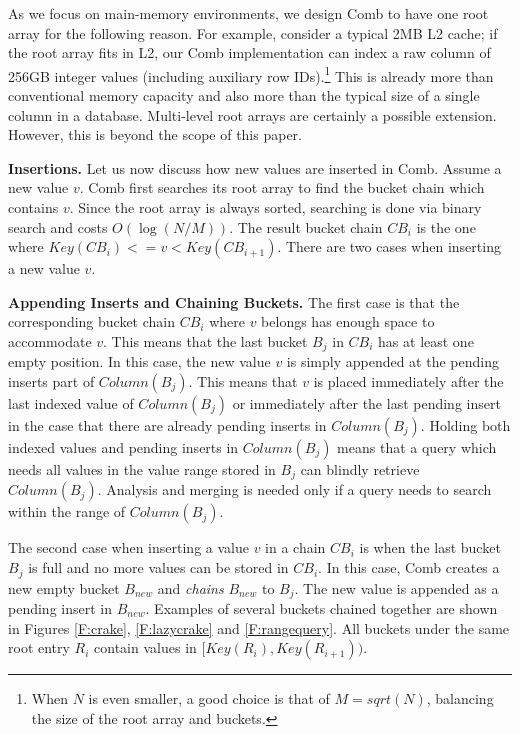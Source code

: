 \documentclass{sig-alternate}
\begin{document}
As we focus on main-memory environments, we design
Comb to have one root array for the following reason.
For example, consider a typical 2MB L2 cache; if the root array fits in L2,
our Comb implementation can index
a raw column of 256GB integer values (including auxiliary row IDs).\footnote{
\small
When $N$ is even smaller,  a good choice is that of $M = sqrt(N)$,
balancing the size of the root array and buckets.
}
This is already more than conventional memory capacity and
also more than the typical size of a single column in a database.
Multi-level root arrays are certainly a possible extension.
However, this is beyond the scope of this paper.

\textbf{Insertions.}
Let us now discuss how new values are inserted in Comb.
Assume a new value $v$.
Comb first searches its root array to find the bucket chain which contains $v$.
Since the root array is always sorted, searching is done via binary search and costs $O(\log(N/M))$.
The result bucket chain $CB_i$ is the one where $Key(CB_i)<=v<Key(CB_{i+1})$.
There are two cases when inserting a new value $v$.

\textbf{Appending Inserts and Chaining Buckets.}
The first case is that the corresponding bucket chain $CB_i$ where $v$ belongs has enough space to accommodate $v$.
This means that the last bucket $B_j$ in $CB_i$ has at least one empty position.
In this case, the new value $v$ is simply appended at the pending inserts part of $Column(B_j)$.
This means that $v$ is placed immediately after the last indexed value of $Column(B_j)$ or immediately after the
last pending insert in the case that there are already pending inserts in $Column(B_j)$.
Holding both indexed values and pending inserts in $Column(B_j)$ means that a query which needs all values
in the value range stored in $B_j$ can blindly retrieve $Column(B_j)$. Analysis and merging is needed
only if a query needs to search within the range of $Column(B_j)$.

The second case when inserting a value $v$ in a chain $CB_i$
is when the last bucket $B_j$ is full and no more values can be stored in $CB_i$.
In this case, Comb creates a new empty bucket $B_{new}$
and \emph{chains} $B_{new}$ to $B_j$. The new value is appended as a pending insert in $B_{new}$.
Examples of several buckets chained together are shown in Figures \ref{F:crake}, \ref{F:lazycrake} and \ref{F:rangequery}.
All buckets under the same root entry $R_i$ contain values in $[Key(R_i),Key(R_{i+1}))$.
\end{document}
